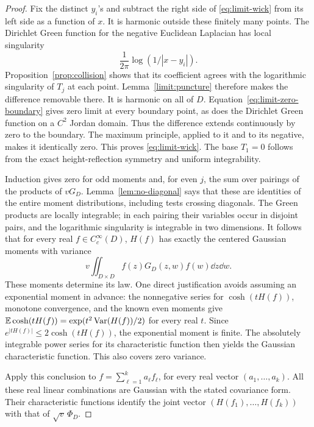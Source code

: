 \begin{proof}
Fix the distinct \(y_i\)'s and subtract the right side of
\eqref{eq:limit-wick} from its left side as a function of \(x\).
It is harmonic outside these finitely many points.
The Dirichlet Green function for the negative Euclidean Laplacian
has local singularity
\[
             \frac1{2\pi}\log(1/|x-y_i|).
\]
Proposition~\ref{prop:collision} shows that its coefficient agrees
with the logarithmic singularity of \(T_j\) at each point.
Lemma~\ref{limit:puncture} therefore makes the difference removable
there.  It is harmonic on all of \(D\).
Equation~\eqref{eq:limit-zero-boundary} gives zero limit at every
boundary point, as does the Dirichlet Green function on a \(C^2\)
Jordan domain.  Thus the difference extends continuously by zero
to the boundary.  The maximum principle, applied to it and to its
negative, makes it identically zero.  This proves
\eqref{eq:limit-wick}.  The base \(T_1=0\) follows from the exact
height-reflection symmetry and uniform integrability.

Induction gives zero for odd moments and, for even \(j\), the sum
over pairings of the products of \(vG_D\).
Lemma~\ref{lem:no-diagonal} says that these are identities of the
entire moment distributions, including tests crossing diagonals.
The Green products are locally integrable; in each pairing their
variables occur in disjoint pairs, and the logarithmic singularity
is integrable in two dimensions.
It follows that for every real \(f\in C_c^\infty(D)\), \(H(f)\)
has exactly the centered Gaussian moments with variance
\[
       v\iint_{D\times D}f(z)G_D(z,w)f(w)\dd z\dd w.
\]
These moments determine its law.  One direct justification avoids
assuming an exponential moment in advance: the nonnegative series
for \(\cosh(tH(f))\), monotone convergence, and the known even
moments give
\(\mathbb E\cosh(tH(f))=\exp(t^2\operatorname{Var}(H(f))/2)\) for every real \(t\).
Since \(e^{|tH(f)|}\le2\cosh(tH(f))\), the exponential moment is
finite.  The absolutely integrable power series for its
characteristic function then yields the Gaussian characteristic
function.  This also covers zero variance.

Apply this conclusion to
\(f=\sum_{\ell=1}^k a_\ell f_\ell\), for every real vector
\((a_1,\ldots,a_k)\).  All these real linear combinations are
Gaussian with the stated covariance form.  Their characteristic
functions identify the joint vector
\((H(f_1),\ldots,H(f_k))\) with that of
\(\sqrt v\,\Phi_D\).


\end{proof}
